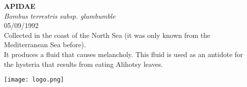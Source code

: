 \documentclass[
  landscape]{article}
\author{}
\date{\vspace{-2.5em}}
\begin{document}

\begin{mdframed}[linecolor=mycolortext, linewidth=2pt, backgroundcolor=mycolor]

  \bigskip
  \begin{flushright}
  \begin{minipage}[t][-50ex][t]{16em}  
  \end{minipage}
  \end{flushright}
  \bigskip
  \begin{adjustwidth}{1cm}{1cm}
  {\fontsize{50pt}{0pt}\selectfont\bf\textcolor{mycolortext}{ APIDAE }} \\
  \linebreak
  \linebreak
  {\fontsize{40pt}{100pt}\selectfont\textcolor{mycolortext}{\emph{ Bombus terrestris subsp. glumbumble }}} \\
  \vfill
  {\fontsize{30pt}{100pt}\selectfont\textcolor{mycolortext}{ 05/09/1992 }} \\
  \vfill
  {\fontsize{30pt}{100pt}\selectfont\textcolor{mycolortext}{ Collected in the coast of the North Sea (it was only known from the Mediterranean Sea before). }} \\
  \vfill
  {\fontsize{30pt}{50pt}\selectfont\textcolor{mycolortext}{ It produces a fluid that causes melancholy. This fluid is used as an antidote for the hysteria that results from eating Alihotsy leaves. }} \\
  \end{adjustwidth}
  \begin{center}
  \texttt{[image: logo.png]}
  \end{center}
  \end{mdframed}
  \pagebreak

\end{document}
